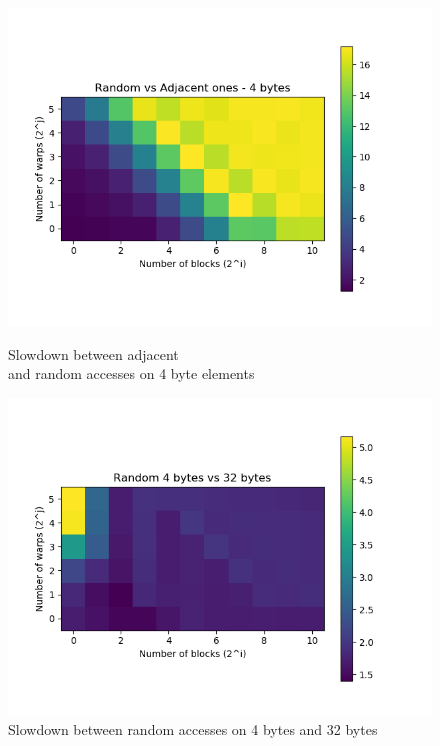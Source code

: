 \begin{figure}[!ht]
  \begin{minipage}[b]{0.5\linewidth}
    \centering
    \includegraphics[width=\linewidth]{Chapters/Accesses/RandomvsAdjacentones4bytes.png} 
    \caption{Slowdown between adjacent\\ and random accesses on 4 byte elements} 
    \vspace{4ex}
  \end{minipage}%
  \begin{minipage}[b]{0.5\linewidth}
    \centering
    \includegraphics[width=\linewidth]{Chapters/Accesses/Random4bytesvs32bytes.png} 
    \caption{Slowdown between random accesses on 4 bytes and 32 bytes} 
    \label{fig:randomaccesses4vs32}
    \vspace{4ex}
  \end{minipage} 
\end{figure}

